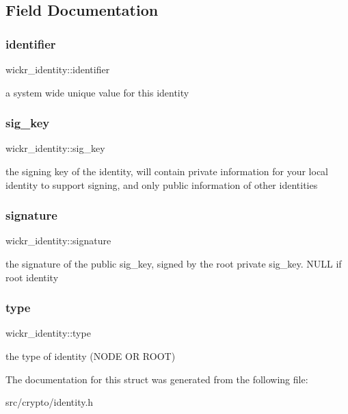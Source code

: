 \subsection{Field Documentation}
\mbox{\label{structwickr__identity_aed3657b22d83bb810b51ea1d1520b23e}} 
\subsubsection{\texorpdfstring{identifier}{identifier}}
{\footnotesize\ttfamily wickr\+\_\+identity\+::identifier}

a system wide unique value for this identity \mbox{\label{structwickr__identity_a788a08ac03576cb76d9b2eaf81a7af3e}} 
\subsubsection{\texorpdfstring{sig\+\_\+key}{sig\_key}}
{\footnotesize\ttfamily wickr\+\_\+identity\+::sig\+\_\+key}

the signing key of the identity, will contain private information for your local identity to support signing, and only public information of other identities \mbox{\label{structwickr__identity_afb6bd9f5f9707be10fb273ce8d0b5928}} 
\subsubsection{\texorpdfstring{signature}{signature}}
{\footnotesize\ttfamily wickr\+\_\+identity\+::signature}

the signature of the public \textquotesingle{}sig\+\_\+key\textquotesingle{}, signed by the root private \textquotesingle{}sig\+\_\+key\textquotesingle{}. N\+U\+LL if root identity \mbox{\label{structwickr__identity_a685dae977849c05c84ee4a0b10c9396d}} 
\subsubsection{\texorpdfstring{type}{type}}
{\footnotesize\ttfamily wickr\+\_\+identity\+::type}

the type of identity (N\+O\+DE OR R\+O\+OT) 

The documentation for this struct was generated from the following file\+:\begin{DoxyCompactItemize}
\item 
src/crypto/identity.\+h\end{DoxyCompactItemize}
